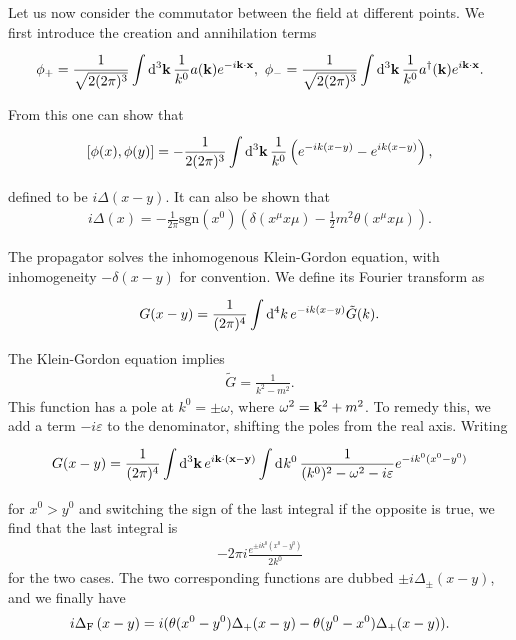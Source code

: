 Let us now consider the commutator between the field at different points. We first introduce the creation and annihilation terms
\begin{align*}
	\phi_{+} = \frac{1}{\sqrt{2(2\pi)^{3}}}\integ[3]{}{}{\vb{k}}{\frac{1}{k^{0}}a(\vb{k})e^{-i\vb{k}\cdot\vb{x}}},\ \phi_{-} = \frac{1}{\sqrt{2(2\pi)^{3}}}\integ[3]{}{}{\vb{k}}{\frac{1}{k^{0}}a\adj(\vb{k})e^{i\vb{k}\cdot\vb{x}}}.
\end{align*}
From this one can show that
\begin{align*}
	\comm{\phi(x)}{\phi(y)} = -\frac{1}{2(2\pi)^{3}}\integ[3]{}{}{\vb{k}}{\frac{1}{k^{0}}\left(e^{-ik(x - y)} - e^{ik(x - y)}\right)},
\end{align*}
defined to be $i\Delta(x - y)$. It can also be shown that
\begin{align*}
	i\Delta(x) = -\frac{1}{2\pi}\text{sgn}(x^{0})(\delta(x^{\mu}x{\mu}) - \frac{1}{2}m^{2}\theta(x^{\mu}x{\mu})).
\end{align*}

The propagator solves the inhomogenous Klein-Gordon equation, with inhomogeneity $-\delta(x - y)$ for convention. We define its Fourier transform as
\begin{align*}
	G(x - y) = \frac{1}{(2\pi)^{4}}\int\limits_{}^{}\dd[4]{k}e^{-ik(x - y)}\tilde{G}(k).
\end{align*}
The Klein-Gordon equation implies
\begin{align*}
	\tilde{G} = \frac{1}{k^{2} - m^{2}}.
\end{align*}
This function has a pole at $k^{0} = \pm \omega$, where $\omega^{2} = \vb{k}^{2} + m^{2}$. To remedy this, we add a term $-i\varepsilon$ to the denominator, shifting the poles from the real axis. Writing
\begin{align*}
	G(x - y) = \frac{1}{(2\pi)^{4}}\int\limits_{}^{}\dd[3]{\vb{k}}e^{i\vb{k}\cdot(\vb{x} - \vb{y})}\int\limits_{}^{}\dd[]{k^{0}}\frac{1}{(k^{0})^{2} - \omega^{2} - i\varepsilon}e^{-ik^{0}(x^{0} - y^{0})}
\end{align*}
for $x^{0} > y^{0}$ and switching the sign of the last integral if the opposite is true, we find that the last integral is
\begin{align}
	-2\pi i\frac{e^{\pm ik^{0}(x^{0} - y^{0})}}{2k^{0}}
\end{align}
for the two cases. The two corresponding functions are dubbed $\pm i\Delta_{\pm}(x - y)$, and we finally have
\begin{align*}
	i\Delta_{\text{F}}\left(x - y\right) = i(\theta(x^{0} - y^{0})\Delta_{+}(x - y) - \theta(y^{0} - x^{0})\Delta_{+}(x - y)).
\end{align*}

